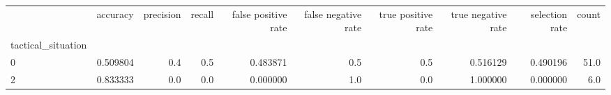 \begin{tabular}{lrrrrrrrrr}
\toprule
{} &  accuracy &  precision &  recall &  false positive rate &  false negative rate &  true positive rate &  true negative rate &  selection rate &  count \\
tactical\_situation &           &            &         &                      &                      &                     &                     &                 &        \\
\midrule
0                  &  0.509804 &        0.4 &     0.5 &             0.483871 &                  0.5 &                 0.5 &            0.516129 &        0.490196 &   51.0 \\
2                  &  0.833333 &        0.0 &     0.0 &             0.000000 &                  1.0 &                 0.0 &            1.000000 &        0.000000 &    6.0 \\
\bottomrule
\end{tabular}
